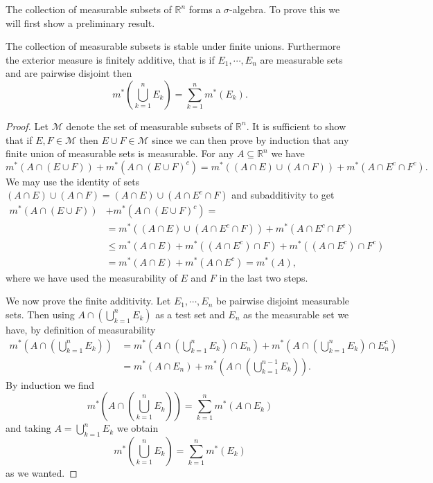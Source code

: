 \documentclass[12pt,oneside]{book}
\numberwithin{table}{section}
\numberwithin{equation}{section}
\numberwithin{figure}{section}
\newcommand{\R}{\mathbb{R}}
\newcommand{\M}{\mathcal{M}}
\newcommand{\ext}[1]{m^* \! \left( #1 \right)}
\begin{document}
The collection of measurable subsets of \( \R^n \) forms a \( \sigma \)-algebra. To prove this we will first show a preliminary result. 
\begin{proposition}
	The collection of measurable subsets is stable under finite unions. Furthermore the exterior measure is finitely additive, that is if \( E_1, \cdots, E_n \) are measurable sets and are pairwise disjoint then 
	\begin{equation*}
		\ext{\bigcup_{k = 1}^n E_k} = \sum_{k = 1}^{n} \ext{E_k}. 
	\end{equation*}
\end{proposition}
\begin{proof}
	Let \( \M \) denote the set of measurable subsets of \( \R^n \). It is sufficient to show that if \( E, F \in \M \) then \(  E \cup F \in \M \) since we can then prove by induction that any finite union of measurable sets is measurable. For any \( A \subseteq \R^n \) we have
	\begin{equation*}
		\ext{A \cap (E \cup F)} + \ext{A \cap (E \cup F)^c} = \ext{(A \cap E) \cup (A \cap F)} + \ext{A \cap E^c \cap F^c}.
	\end{equation*}
	We may use the identity of sets \( (A \cap E) \cup (A \cap F) = (A \cap E) \cup (A \cap E^c \cap F) \) and subadditivity to get
	\begin{align*}
		\ext{A \cap (E \cup F)} & + \ext{A \cap (E \cup F)^c} = \\
														& = \ext{(A \cap E) \cup (A \cap E^c \cap F)} + \ext{A \cap E^c \cap F^c} \\
														& \leq \ext{A \cap E} + \ext{(A \cap E^c) \cap F} + \ext{(A \cap E^c) \cap F^c} \\
														& = \ext{A \cap E} + \ext{A \cap E^c} = \ext{A},
	\end{align*}
	where we have used the measurability of \( E \) and \( F \) in the last two steps. 

	We now prove the finite additivity. Let \( E_1, \cdots, E_n \) be pairwise disjoint measurable sets. Then using \( A \cap \left(\bigcup_{k = 1}^n	E_k\right) \) as a test set and \( E_n \) as the measurable set we have, by definition of measurability
	\begin{align*}
		\ext{A \cap \left(\bigcup_{k = 1}^n	E_k\right)} & = \ext{A \cap \left(\bigcup_{k = 1}^n	E_k\right) \cap E_n} + \ext{A \cap \left(\bigcup_{k = 1}^n	E_k\right) \cap E_n^c} \\
																										& = \ext{A \cap E_n} + \ext{A \cap \left(\bigcup_{k = 1}^{n-1}	E_k\right)}.
	\end{align*}
	By induction we find
	\begin{equation*}
		\ext{A \cap \left(\bigcup_{k = 1}^n	E_k\right)} = \sum_{k = 1}^{n} \ext{A \cap E_k} 
	\end{equation*}
	and taking \( A = \bigcup_{k = 1}^n E_k \) we obtain
	\begin{equation*}
		\ext{\bigcup_{k = 1}^n E_k} = \sum_{k = 1}^{n}\ext{E_k} 
	\end{equation*}
	as we wanted.
\end{proof}
\end{document}
